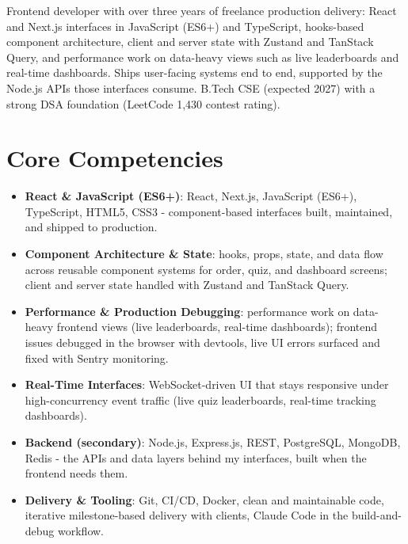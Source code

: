\documentclass[11pt,a4paper,sans]{moderncv}
\begin{document}
\makecvtitle


\vspace{6pt}
\small{Frontend developer with over three years of freelance production delivery: React and Next.js interfaces in JavaScript (ES6+) and TypeScript, hooks-based component architecture, client and server state with Zustand and TanStack Query, and performance work on data-heavy views such as live leaderboards and real-time dashboards. Ships user-facing systems end to end, supported by the Node.js APIs those interfaces consume. B.Tech CSE (expected 2027) with a strong DSA foundation (LeetCode 1,430 contest rating).}


\section{Core Competencies}
\vspace{1pt}
\begin{itemize}

\item \textbf{React \& JavaScript (ES6+)}: React, Next.js, JavaScript (ES6+), TypeScript, HTML5, CSS3 - component-based interfaces built, maintained, and shipped to production.

\item \textbf{Component Architecture \& State}: hooks, props, state, and data flow across reusable component systems for order, quiz, and dashboard screens; client and server state handled with Zustand and TanStack Query.

\item \textbf{Performance \& Production Debugging}: performance work on data-heavy frontend views (live leaderboards, real-time dashboards); frontend issues debugged in the browser with devtools, live UI errors surfaced and fixed with Sentry monitoring.

\item \textbf{Real-Time Interfaces}: WebSocket-driven UI that stays responsive under high-concurrency event traffic (live quiz leaderboards, real-time tracking dashboards).

\item \textbf{Backend (secondary)}: Node.js, Express.js, REST, PostgreSQL, MongoDB, Redis - the APIs and data layers behind my interfaces, built when the frontend needs them.

\item \textbf{Delivery \& Tooling}: Git, CI/CD, Docker, clean and maintainable code, iterative milestone-based delivery with clients, Claude Code in the build-and-debug workflow.

\end{itemize}
\end{document}
